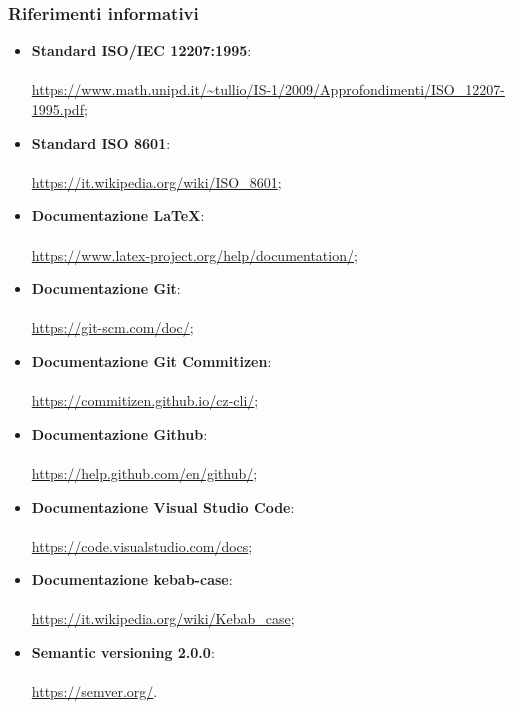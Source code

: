 \documentclass[../norme-di-progetto.tex]{subfiles}
\begin{document}
\subsubsection{Riferimenti informativi}
\begin{itemize}
  \item \textbf{Standard ISO/IEC 12207:1995}: \\ \\ \href{https://www.math.unipd.it/~tullio/IS-1/2009/Approfondimenti/ISO_12207-1995.pdf}{https://www.math.unipd.it/\textasciitilde tullio/IS-1/2009/Approfondimenti/ISO\_12207-1995.pdf};
  \item \textbf{Standard ISO 8601}: \\ \\ \href{https://it.wikipedia.org/wiki/ISO_8601}{https://it.wikipedia.org/wiki/ISO\_8601};
\item \textbf{Documentazione \LaTeX}: \\ \\ \href{https://www.latex-project.org/help/documentation/}{https://www.latex-project.org/help/documentation/};
\item \textbf{Documentazione Git}: \\ \\ \href{https://git-scm.com/doc/}{https://git-scm.com/doc/};
\item \textbf{Documentazione Git Commitizen}: \\ \\ \href{https://commitizen.github.io/cz-cli/}{https://commitizen.github.io/cz-cli/};
\item \textbf{Documentazione Github}: \\ \\ \href{https://help.github.com/en/github/}{https://help.github.com/en/github/};
\item \textbf{Documentazione Visual Studio Code}: \\ \\ \href{https://code.visualstudio.com/docs}{https://code.visualstudio.com/docs};
\item \textbf{Documentazione kebab-case}: \\ \\ \href{https://it.wikipedia.org/wiki/Kebab_case}{https://it.wikipedia.org/wiki/Kebab\_case};
\item \textbf{Semantic versioning 2.0.0}: \\ \\ \href{https://semver.org/}{https://semver.org/}.
\end{itemize}
\end{document}
